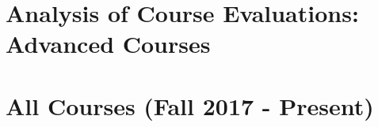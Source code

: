 \documentclass[../../main.tex]{subfiles}
\begin{document}
\begin{flushleft}

\end{flushleft}

\section{Analysis of Course Evaluations: Advanced Courses}
\label{sec:adv_eval}

\begin{flushleft}

\end{flushleft}

\section{All Courses (Fall 2017 - Present)}
\label{sec:future_teaching}

\begin{flushleft}

\end{flushleft}
\end{document}

